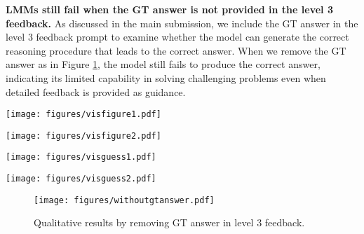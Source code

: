 \documentclass{article} %
\begin{document}
\textbf{LMMs still fail when the GT answer is not provided in the level 3 feedback.} As discussed in the main submission, we include the GT answer in the level 3 feedback prompt to examine whether the model can generate the correct reasoning procedure that leads to the correct answer. When we remove the GT answer as in Figure \ref{fig:withoutgtanswer}, the model still fails to produce the correct answer, indicating its limited capability in solving challenging problems even when detailed feedback is provided as guidance.




\vspace{3cm}
\begin{figure*}[h]
    \centering
    \texttt{[image: figures/visfigure1.pdf]}
    \caption{Qualitative results on different LMMs.}
    \label{fig:viscompare1}
\end{figure*}

\begin{figure*}[ht]
    \centering
    \texttt{[image: figures/visfigure2.pdf]}
    \caption{Qualitative results on different LMMs.}
    \label{fig:viscompare2}
\end{figure*}

\begin{figure*}[t]
    \centering
    \texttt{[image: figures/visguess1.pdf]}
    \caption{An example that model tends to guess answers.}
    \label{fig:visguess1}
\end{figure*}

\begin{figure*}[t]
    \centering
    \texttt{[image: figures/visguess2.pdf]}
    \caption{An example that model tends to guess answers.}
    \label{fig:visguess2}
\end{figure*}

\begin{figure}[!t]
    \centering
    \texttt{[image: figures/withoutgtanswer.pdf]}
    \caption{Qualitative results by removing GT answer in level 3 feedback.}
    \label{fig:withoutgtanswer}
\end{figure}
\end{document}
